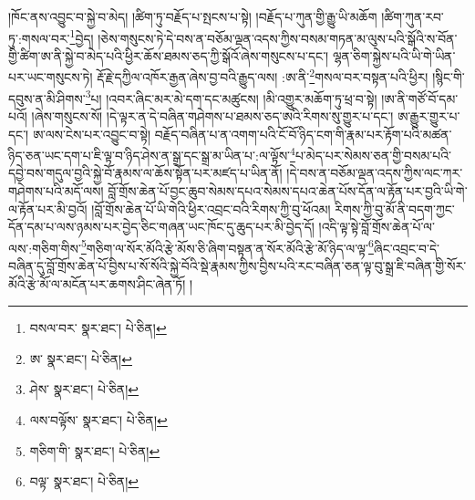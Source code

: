 །ཁོང་ནས་འབྱུང་བ་སྐྱེ་བ་མེད། །ཚིག་ཏུ་བརྗོད་པ་སྤངས་པ་སྟེ། །བརྗོད་པ་ཀུན་གྱི་རྒྱུ་ཡི་མཆོག །ཚིག་ཀུན་རབ་ཏུ་:གསལ་བར་\footnote{བསལ་བར་  སྣར་ཐང་།  པེ་ཅིན། }བྱེད། །ཅེས་གསུངས་ཏེ་དེ་བས་ན་བཅོམ་ལྡན་འདས་ཀྱིས་བསམ་གཏན་མ་ལུས་པའི་སྒོའི་ས་བོན་གྱི་ཚིག་ཨ་ནི་སྐྱེ་བ་མེད་པའི་ཕྱིར་ཆོས་ཐམས་ཅད་ཀྱི་སྒོའོ་ཞེས་གསུངས་པ་དང་། ལྷན་ཅིག་སྐྱེས་པའི་ཡི་གེ་ཡིན་པར་ཡང་གསུངས་ཏེ། རྡོ་རྗེ་དཀྱིལ་འཁོར་རྒྱན་ཞེས་བྱ་བའི་རྒྱུད་ལས། :ཨ་ནི་\footnote{ཨ་  སྣར་ཐང་།  པེ་ཅིན། }གསལ་བར་བསྟན་པའི་ཕྱིར། །སྙིང་གི་དབུས་ན་མི་ཤིགས་\footnote{ཤེས་  སྣར་ཐང་།  པེ་ཅིན། }པ། །འབར་ཞིང་མར་མེ་དག་དང་མཚུངས། །མི་འགྱུར་མཆོག་ཏུ་ཕྲ་བ་སྟེ། །ཨ་ནི་གཙོ་བོ་དམ་པའོ། །ཞེས་གསུངས་སོ། །དེ་ལྟར་ན་དེ་བཞིན་གཤེགས་པ་ཐམས་ཅད་ཨའི་རིགས་སུ་གྱུར་པ་དང་། ཨ་རྒྱུར་གྱུར་པ་དང་། ཨ་ལས་ངེས་པར་འབྱུང་བ་སྟེ། བརྗོད་བཞིན་པ་ན་འགག་པའི་ངོ་བོ་ཉིད་ངག་གི་རྣམ་པར་རྟོག་པའི་མཚན་ཉིད་ཅན་ཡང་དག་པ་ཇི་ལྟ་བ་ཉིད་ཤེས་ན་སྒྲ་དང་སྒྲ་མ་ཡིན་པ་:ལ་ལྟོས་\footnote{ལས་བལྟོས་  སྣར་ཐང་།  པེ་ཅིན། }པ་མེད་པར་སེམས་ཅན་གྱི་བསམ་པའི་དབྱེ་བས་གདུལ་བྱའི་སྐྱེ་བོ་རྣམས་ལ་ཆོས་སྟོན་པར་མཛད་པ་ཡིན་ནོ། །དེ་བས་ན་བཅོམ་ལྡན་འདས་ཀྱིས་ལང་ཀར་གཤེགས་པའི་མདོ་ལས། བློ་གྲོས་ཆེན་པོ་བྱང་ཆུབ་སེམས་དཔའ་སེམས་དཔའ་ཆེན་པོས་དོན་ལ་རྟོན་པར་བྱའི་ཡི་གེ་ལ་རྟོན་པར་མི་བྱའོ། །བློ་གྲོས་ཆེན་པོ་ཡི་གེའི་ཕྱིར་འབྲང་བའི་རིགས་ཀྱི་བུ་ཕོའམ། རིགས་ཀྱི་བུ་མོ་ནི་བདག་ཀྱང་དོན་དམ་པ་ལས་ཉམས་པར་བྱེད་ཅིང་གཞན་ཡང་ཁོང་དུ་ཆུད་པར་མི་བྱེད་དོ། །འདི་ལྟ་སྟེ་བློ་གྲོས་ཆེན་པོ་ལ་ལས་:གཅིག་གིས་\footnote{གཅིག་གི་  སྣར་ཐང་།  པེ་ཅིན། }གཅིག་ལ་སོར་མོའི་རྩེ་མོས་ཅི་ཞིག་བསྟན་ན་སོར་མོའི་རྩེ་མོ་ཉིད་ལ་ལྟ་\footnote{བལྟ་  སྣར་ཐང་།  པེ་ཅིན། }ཞིང་འབྲང་བ་དེ་བཞིན་དུ་བློ་གྲོས་ཆེན་པོ་བྱིས་པ་སོ་སོའི་སྐྱེ་བོའི་སྡེ་རྣམས་ཀྱིས་བྱིས་པའི་རང་བཞིན་ཅན་ལྟ་བུ་སྒྲ་ཇི་བཞིན་གྱི་སོར་མོའི་རྩེ་མོ་ལ་མངོན་པར་ཆགས་ཤིང་ཞེན་ཏོ། །
